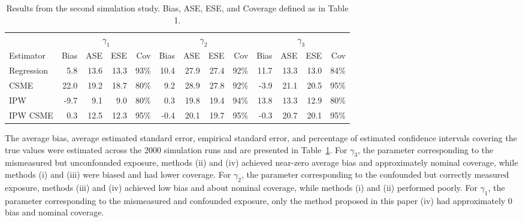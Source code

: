 \documentclass[useAMS,usenatbib,referee]{biom}
\begin{document}
\begin{table}[]
    \footnotesize
    \caption{Results from the second simulation study. Bias, ASE, ESE, and Coverage defined as in Table 1.}
    \begin{center}
    \begin{tabular}{lrrrrrrrrrrrr}
    \hline
        & \multicolumn{4}{c}{$\gamma_{1}$} & \multicolumn{4}{c}{$\gamma_{2}$} & \multicolumn{4}{c}{$\gamma_{3}$} \\
        Estimator & Bias & ASE & ESE & Cov & Bias & ASE & ESE & Cov & Bias & ASE & ESE & Cov \\
         \hline
Regression & 5.8 & 13.6 & 13.3 & 93\% & 10.4 & 27.9 & 27.4 & 92\% & 11.7 & 13.3 & 13.0 & 84\% \\
CSME & 22.0 & 19.2 & 18.7 & 80\% & 9.2 & 28.9 & 27.8 & 92\% & -3.9 & 21.1 & 20.5 & 95\% \\
IPW & -9.7 & 9.1 & 9.0 & 80\% & 0.3 & 19.8 & 19.4 & 94\% & 13.8 & 13.3 & 12.9 & 80\% \\
IPW CSME & 0.3 & 12.5 & 12.3 & 95\% & -0.4 & 20.1 & 19.7 & 95\% & -0.3 & 20.7 & 20.1 & 95\% \\
         \hline
    \end{tabular}
    \end{center}
    \label{tab:two}
\end{table}

The average bias, average estimated standard error, empirical standard error, and percentage of estimated confidence intervals covering the true values were estimated across the 2000 simulation runs and are presented in Table~\ref{tab:two}. For $\gamma_{3}$, the parameter corresponding to the mismeasured but unconfounded exposure, methods (ii) and (iv) achieved near-zero average bias and approximately nominal coverage, while methods (i) and (iii) were biased and had lower coverage. For $\gamma_{2}$, the parameter corresponding to the confounded but correctly measured exposure, methods (iii) and (iv) achieved low bias and about nominal coverage, while methods (i) and (ii) performed poorly. For $\gamma_{1}$, the parameter corresponding to the mismeasured and confounded exposure, only the method proposed in this paper (iv) had approximately 0 bias and nominal coverage.
\end{document}
